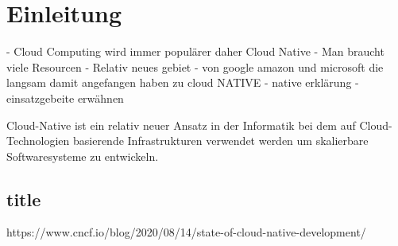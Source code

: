 \chapter{Einleitung}

- Cloud Computing wird immer populärer daher Cloud Native
- Man braucht viele Resourcen
- Relativ neues gebiet
- von google amazon und microsoft die langsam damit angefangen haben zu cloud NATIVE
- native erklärung
- einsatzgebeite erwähnen

Cloud-Native ist ein relativ neuer Ansatz in der Informatik bei dem auf Cloud-Technologien basierende Infrastrukturen verwendet werden um skalierbare Softwaresysteme zu entwickeln.

\section{title}

https://www.cncf.io/blog/2020/08/14/state-of-cloud-native-development/